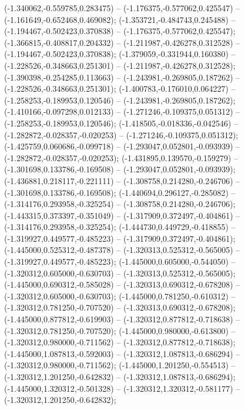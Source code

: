  (-1.340062,-0.559785,0.283475) -- (-1.176375,-0.577062,0.425547) -- (-1.161649,-0.652468,0.469082);
 (-1.353721,-0.484743,0.245488) -- (-1.194467,-0.502423,0.370838) -- (-1.176375,-0.577062,0.425547);
 (-1.366815,-0.408817,0.204332) -- (-1.211987,-0.426278,0.312528) -- (-1.194467,-0.502423,0.370838);
 (-1.379059,-0.331944,0.160380) -- (-1.228526,-0.348663,0.251301) -- (-1.211987,-0.426278,0.312528);
 (-1.390398,-0.254285,0.113663) -- (-1.243981,-0.269805,0.187262) -- (-1.228526,-0.348663,0.251301);
 (-1.400783,-0.176010,0.064227) -- (-1.258253,-0.189953,0.120546) -- (-1.243981,-0.269805,0.187262);
 (-1.410166,-0.097298,0.012133) -- (-1.271246,-0.109375,0.051312) -- (-1.258253,-0.189953,0.120546);
 (-1.418505,-0.018336,-0.042546) -- (-1.282872,-0.028357,-0.020253) -- (-1.271246,-0.109375,0.051312);
 (-1.425759,0.060686,-0.099718) -- (-1.293047,0.052801,-0.093939) -- (-1.282872,-0.028357,-0.020253);
 (-1.431895,0.139570,-0.159279) -- (-1.301698,0.133786,-0.169508) -- (-1.293047,0.052801,-0.093939);
 (-1.436881,0.218117,-0.221111) -- (-1.308758,0.214280,-0.246706) -- (-1.301698,0.133786,-0.169508);
 (-1.440694,0.296127,-0.285082) -- (-1.314176,0.293958,-0.325254) -- (-1.308758,0.214280,-0.246706);
 (-1.443315,0.373397,-0.351049) -- (-1.317909,0.372497,-0.404861) -- (-1.314176,0.293958,-0.325254);
 (-1.444730,0.449729,-0.418855) -- (-1.319927,0.449577,-0.485223) -- (-1.317909,0.372497,-0.404861);
 (-1.445000,0.525312,-0.487378) -- (-1.320313,0.525312,-0.565005) -- (-1.319927,0.449577,-0.485223);
 (-1.445000,0.605000,-0.544050) -- (-1.320312,0.605000,-0.630703) -- (-1.320313,0.525312,-0.565005);
 (-1.445000,0.690312,-0.585028) -- (-1.320313,0.690312,-0.678208) -- (-1.320312,0.605000,-0.630703);
 (-1.445000,0.781250,-0.610312) -- (-1.320312,0.781250,-0.707520) -- (-1.320313,0.690312,-0.678208);
 (-1.445000,0.877812,-0.619903) -- (-1.320312,0.877812,-0.718638) -- (-1.320312,0.781250,-0.707520);
 (-1.445000,0.980000,-0.613800) -- (-1.320312,0.980000,-0.711562) -- (-1.320312,0.877812,-0.718638);
 (-1.445000,1.087813,-0.592003) -- (-1.320312,1.087813,-0.686294) -- (-1.320312,0.980000,-0.711562);
 (-1.445000,1.201250,-0.554513) -- (-1.320312,1.201250,-0.642832) -- (-1.320312,1.087813,-0.686294);
 (-1.445000,1.320312,-0.501328) -- (-1.320312,1.320312,-0.581177) -- (-1.320312,1.201250,-0.642832);
